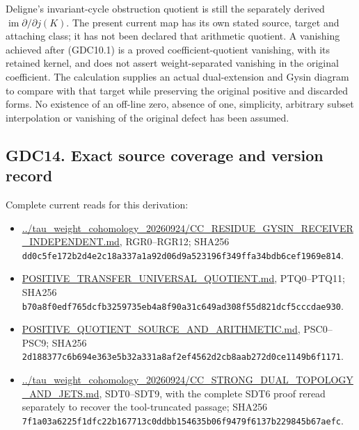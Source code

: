 Deligne's invariant-cycle obstruction quotient is still the separately
derived \(\operatorname{im}\partial/\partial j(K)\). The present current
map has its own stated source, target and attaching class; it has not
been declared that arithmetic quotient. A vanishing achieved after
(GDC10.1) is a proved coefficient-quotient vanishing, with its retained
kernel, and does not assert weight-separated vanishing in the original
coefficient. The calculation supplies an actual dual-extension and Gysin
diagram to compare with that target while preserving the original
positive and discarded forms. No existence of an off-line zero, absence
of one, simplicity, arbitrary subset interpolation or vanishing of the
original defect has been assumed.

\subsection{GDC14. Exact source coverage and version
record}\label{gdc14.-exact-source-coverage-and-version-record}

Complete current reads for this derivation:

\begin{itemize}
\tightlist
\item
  \href{https://github.com/KokunoYumeto/zeta-function-research-reader/blob/36a82ecca98addb8a98b48204e349737856c7223/workbenches/splitzero-tandem/continuations/20260924-cohomology-weight-and-character-lifts/gct-weight-control/proofs/CC_RESIDUE_GYSIN_RECEIVER_INDEPENDENT.md}{../tau\_weight\_cohomology\_20260924/CC\_RESIDUE\_GYSIN\_RECEIVER\_INDEPENDENT.md},
  RGR0--RGR12; SHA256
  \texttt{dd0c5fe172b2d4e2c18a337a1a92d06d9a523196f349ffa34bdb6cef1969e814}.
\item
  \href{https://github.com/KokunoYumeto/zeta-function-research-reader/blob/36a82ecca98addb8a98b48204e349737856c7223/workbenches/splitzero-tandem/continuations/20260924-cohomology-weight-and-character-lifts/geometric-positive-quotient/POSITIVE_TRANSFER_UNIVERSAL_QUOTIENT.md}{POSITIVE\_TRANSFER\_UNIVERSAL\_QUOTIENT.md},
  PTQ0--PTQ11; SHA256
  \texttt{b70a8f0edf765dcfb3259735eb4a8f90a31c649ad308f55d821dcf5cccdae930}.
\item
  \href{https://github.com/KokunoYumeto/zeta-function-research-reader/blob/36a82ecca98addb8a98b48204e349737856c7223/workbenches/splitzero-tandem/continuations/20260924-cohomology-weight-and-character-lifts/geometric-positive-quotient/POSITIVE_QUOTIENT_SOURCE_AND_ARITHMETIC.md}{POSITIVE\_QUOTIENT\_SOURCE\_AND\_ARITHMETIC.md},
  PSC0--PSC9; SHA256
  \texttt{2d188377c6b694e363e5b32a331a8af2ef4562d2cb8aab272d0ce1149b6f1171}.
\item
  \href{https://github.com/KokunoYumeto/zeta-function-research-reader/blob/36a82ecca98addb8a98b48204e349737856c7223/workbenches/splitzero-tandem/continuations/20260924-cohomology-weight-and-character-lifts/gct-weight-control/proofs/CC_STRONG_DUAL_TOPOLOGY_AND_JETS.md}{../tau\_weight\_cohomology\_20260924/CC\_STRONG\_DUAL\_TOPOLOGY\_AND\_JETS.md},
  SDT0--SDT9, with the complete SDT6 proof reread separately to recover
  the tool-truncated passage; SHA256
  \texttt{7f1a03a6225f1dfc22b167713c0ddbb154635b06f9479f6137b229845b67aefc}.
\end{itemize}

